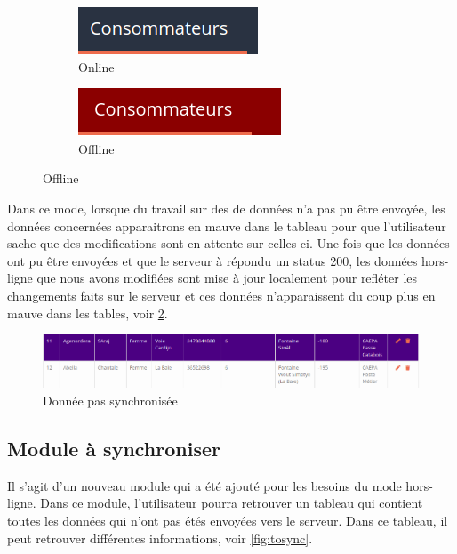 \documentclass{EPL-master-thesis-covers-FR}
\begin{document}
				\begin{figure}[H]
					\caption{Mode}
					\label{fig:mode}
					\centering
					\begin{subfigure}[b]{0.3\textwidth}
  						\includegraphics[width=1\linewidth]{images/consumer_blue}
  						\caption{Online}
					\end{subfigure}%
					\begin{subfigure}[b]{0.333\textwidth}
  						\includegraphics[width=1\linewidth]{images/consumer_red}
  						\caption{Offline}
					\end{subfigure}
					\label{fig:test}
				\end{figure}
			
				Dans ce mode, lorsque du travail sur des de données n'a pas pu être envoyée, les données concernées apparaitrons en mauve dans le tableau pour que l'utilisateur sache que des modifications sont en attente sur celles-ci. Une fois que les données ont pu être envoyées et que le serveur à répondu un status 200, les données hors-ligne que nous avons modifiées sont mise à jour localement pour refléter les changements faits sur le serveur et ces données n'apparaissent du coup plus en mauve dans les tables, voir \ref{fig:purple}. 
				
				\begin{figure}[H]
					\centering
					\includegraphics[width=1\textwidth]{images/purple}
					\caption{Donnée pas synchronisée}
					\label{fig:purple}
				\end{figure}
							
			\subsection{Module à synchroniser}
				Il s'agit d'un nouveau module qui a été ajouté pour les besoins du mode hors-ligne. Dans ce module, l'utilisateur pourra retrouver un tableau qui contient toutes les données qui n'ont pas étés envoyées vers le serveur. Dans ce tableau, il peut retrouver différentes informations, voir \ref{fig:tosync}.
				
\end{document}
